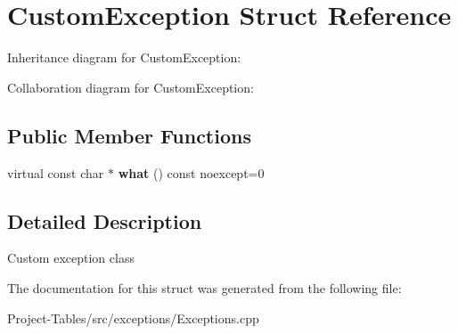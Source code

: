 \hypertarget{structCustomException}{}\section{Custom\+Exception Struct Reference}
\label{structCustomException}


Inheritance diagram for Custom\+Exception\+:


Collaboration diagram for Custom\+Exception\+:
\subsection*{Public Member Functions}
\begin{DoxyCompactItemize}
\item 
\mbox{\label{structCustomException_a39d482093d582d240ed8017d4a57f02d}} 
virtual const char $\ast$ {\bfseries what} () const noexcept=0
\end{DoxyCompactItemize}


\subsection{Detailed Description}
Custom exception class 

The documentation for this struct was generated from the following file\+:\begin{DoxyCompactItemize}
\item 
Project-\/\+Tables/src/exceptions/Exceptions.\+cpp\end{DoxyCompactItemize}
